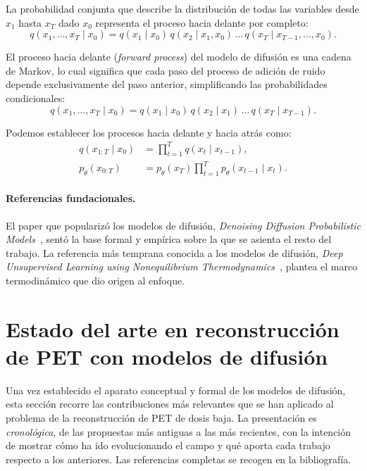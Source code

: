 La probabilidad conjunta que describe la distribución de todas
las variables desde $x_1$ hasta $x_T$ dado $x_0$ representa el
proceso hacia delante por completo:
\begin{equation}
    q(x_1, \ldots, x_T \mid x_0)
    = q(x_1 \mid x_0)\, q(x_2 \mid x_1, x_0) \, \ldots\,
      q(x_T \mid x_{T-1}, \ldots, x_0).
\end{equation}

El proceso hacia delante (\textit{forward process}) del modelo de
difusión es una cadena de Markov, lo cual significa que cada paso
del proceso de adición de ruido depende exclusivamente del paso
anterior, simplificando las probabilidades condicionales:
\begin{equation}
    q(x_1, \ldots, x_T \mid x_0)
    = q(x_1 \mid x_0)\, q(x_2 \mid x_1) \, \ldots\,
      q(x_T \mid x_{T-1}).
\end{equation}

Podemos establecer los procesos hacia delante y hacia atrás como:
\begin{align}
    q(x_{1:T} \mid x_0)
        &= \prod_{t=1}^{T} q(x_t \mid x_{t-1}), \\
    p_\theta(x_{0:T})
        &= p_\theta(x_T) \prod_{t=1}^{T} p_\theta(x_{t-1} \mid x_t).
\end{align}

\paragraph{Referencias fundacionales.}
El paper que popularizó los modelos de difusión, \textit{Denoising
Diffusion Probabilistic Models}~\cite{ho2020ddpm}, sentó la base
formal y empírica sobre la que se asienta el resto del trabajo.
La referencia más temprana conocida a los modelos de difusión,
\textit{Deep Unsupervised Learning using Nonequilibrium
Thermodynamics}~\cite{sohldickstein2015}, plantea el marco
termodinámico que dio origen al enfoque.

\section{Estado del arte en reconstrucción de PET con modelos de
difusión}
\label{sec:estado-del-arte}

Una vez establecido el aparato conceptual y formal de los modelos
de difusión, esta sección recorre las contribuciones más
relevantes que se han aplicado al problema de la reconstrucción
de PET de dosis baja. La presentación es \emph{cronológica}, de
las propuestas más antiguas a las más recientes, con la intención
de mostrar cómo ha ido evolucionando el campo y qué aporta cada
trabajo respecto a los anteriores. Las referencias completas se
recogen en la bibliografía.

